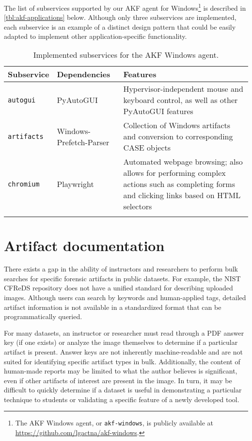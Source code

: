 The list of subservices supported by our AKF agent for
Windows\footnote{The AKF Windows agent, or
  \passthrough{\lstinline!akf-windows!}, is publicly available at
  \url{https://github.com/lgactna/akf-windows}.} is described in
\autoref{tbl:akf-applications} below. Although only three subservices
are implemented, each subservice is an example of a distinct design
pattern that could be easily adapted to implement other
application-specific functionality.


\begin{table*}[tb]
\footnotesize
\centering
\begin{tabularx}{\linewidth}{L{0.2} L{0.2} L{0.6}}
\toprule
  \textbf{Subservice} & \textbf{Dependencies} & \textbf{Features} \\
\midrule
  \passthrough{\lstinline!autogui!} & PyAutoGUI
  \citep{sweigartAsweigartPyautogui2025} & Hypervisor-independent mouse
  and keyboard control, as well as other PyAutoGUI features \\
  \passthrough{\lstinline!artifacts!} & Windows-Prefetch-Parser
  \citep{wittPoorBillionaireWindowsPrefetchParser2025} & Collection of
  Windows artifacts and conversion to corresponding CASE objects \\
  \passthrough{\lstinline!chromium!} & Playwright
  \citep{MicrosoftPlaywrightpython2025} & Automated webpage browsing;
  also allows for performing complex actions such as completing forms and
  clicking links based on HTML selectors \\ \\
\bottomrule
\end{tabularx}
\caption{Implemented subservices for the AKF Windows agent.}\label{tbl:akf-applications}
\end{table*}


\section{Artifact documentation}\label{artifact-documentation}

There exists a gap in the ability of instructors and researchers to
perform bulk searches for specific forensic artifacts in public
datasets. For example, the NIST CFReDS repository does not have a
unified standard for describing uploaded images. Although users can
search by keywords and human-applied tags, detailed artifact information
is not available in a standardized format that can be programmatically
queried.

For many datasets, an instructor or researcher must read through a PDF
answer key (if one exists) or analyze the image themselves to determine
if a particular artifact is present. Answer keys are not inherently
machine-readable and are not suited for identifying specific artifact
types in bulk. Additionally, the content of human-made reports may be
limited to what the author believes is significant, even if other
artifacts of interest are present in the image. In turn, it may be
difficult to quickly determine if a dataset is useful in demonstrating a
particular technique to students or validating a specific feature of a
newly developed tool.


